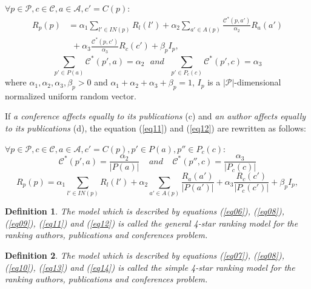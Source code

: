 \documentclass[10pt,leqno,twoside]{article}
\newtheorem{definition}{\indent Definition}[section]
\begin{document}
\begin{enumerate}
$\forall p\in\mathcal{P},  c\in\mathcal{C},  a\in\mathcal{A},c' = C(p):$
\begin{equation} \label {eq11}
\begin{split}
R_p(p) &= \alpha_1\sum_{l'\in IN(p)}R_l(l') +  \alpha_2 \sum_{a'\in A(p)}\frac{\mathcal{C}^*(p,a')}{\alpha_2}R_a(a')\\
&~~ + \alpha_3\frac{\mathcal{C}^*(p,c')}{\alpha_3}R_c(c')+ \beta_pI_p,
\end{split}
\end{equation}
\begin{equation}\label{eq12}
\sum_{p'\in P(a)}\mathcal{C}^*(p',a)=\alpha_2~~~and~~~\sum_{p'\in P_c(c)}\mathcal{C}^*(p',c)=\alpha_3
\end{equation}
where $\alpha_1,\alpha_2,\alpha_3,\beta_p > 0$ and $\alpha_1 + \alpha_2 + \alpha_3 + \beta_p = 1$, $I_p$ is a $|\mathcal{P}|$-dimensional normalized uniform random vector.

If \textit{a conference affects equally to  its publications} (c) and \textit{an author affects equally to  its publications} (d),  the equation (\ref{eq11}) and (\ref{eq12})  are rewritten as follows:

$\forall p\in\mathcal{P},  c\in\mathcal{C},  a\in\mathcal{A},c' = C(p), p'\in P(a), p''\in P_c(c):$
\setlength{\parskip}{3pt}
\begin{equation}\label{eq13}
\mathcal{C}^*(p',a)=\frac{\alpha_2}{|P(a)|}~~~~~and~~~~~\mathcal{C}^*(p'',c)=\frac{\alpha_3}{|P_c(c)|}
\end{equation}
\begin{equation}\label{eq14}
R_p(p) = \alpha_1\sum_{l'\in IN(p)}R_l(l') + \alpha_2\sum_{a'\in A(p)}\frac{R_a(a')}{|P(a')|} + \alpha_3\frac{R_c(c')}{|P_c(c')|} + \beta_pI_p,
\end{equation}
\end{enumerate}
\begin{definition}\label{Def:4starGen}
The model which is described by equations (\ref{eq06}), (\ref{eq08}), (\ref{eq09}), (\ref{eq11}) and (\ref{eq12})
is called  \textit{ the general 4-star ranking model for the ranking authors, publications and conferences problem.}
\end{definition}
\begin{definition}\label{Def:4starSimple}
The model which is described by equations (\ref{eq07}), (\ref{eq08}), (\ref{eq10}), (\ref{eq13}) and (\ref{eq14})
is called  \textit{ the simple 4-star ranking model for the ranking authors, publications and conferences problem.}
\end{definition}
\end{document}
